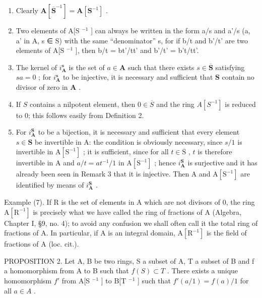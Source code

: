 \begin{enumerate}
\def\labelenumi{(\arabic{enumi})}
\item
  Clearly \(\mathbf{A}[\overline{\mathbf{S}}^{-1}] = \mathbf{A}[\mathbf{S}^{-1}]\) .
\item
  Two elements of A{[}S \(^{-1}\) {]} can always be written in the form a/s and a'/s (a, a' in A, s ∈ S) with the same ``denominator'' s, for if b/t and b'/t' are two elements of A{[}S \(^{-1}\) {]}, then b/t = bt'/tt' and b'/t' = b't/tt'.
\item
  The kernel of \(i_{\mathbf{A}}^{\mathbf{s}}\) is the set of \(a \in \mathbf{A}\) such that there exists \(s \in \overline{\mathbf{S}}\) satisfying \(sa = 0\) ; for \(i_{\mathbf{A}}^{\mathbf{s}}\) to be injective, it is necessary and sufficient that \(\mathbf{S}\) contain no divisor of zero in \(\mathbf{A}\) .
\item
  If \(S\) contains a nilpotent element, then \(0 \in \overline{S}\) and the ring \(A[S^{-1}]\) is reduced to 0; this follows easily from Definition 2.
\item
  For \(i_{\mathbf{A}}^{\mathbf{S}}\) to be a bijection, it is necessary and sufficient that every element \(s \in \mathbf{S}\) be invertible in A: the condition is obviously necessary, since \(s/1\) is invertible in \(\mathrm{A}[\mathrm{S}^{-1}]\) ; it is sufficient, since for all \(t \in \overline{\mathrm{S}}\) , \(t\) is therefore invertible in A and \(a/t = at^{-1}/1\) in \(\mathrm{A}[\mathrm{S}^{-1}]\) ; hence \(i_{\mathbf{A}}^{\mathbf{S}}\) is surjective and it has already been seen in Remark 3 that it is injective. Then A and \(\mathrm{A}[\mathrm{S}^{-1}]\) are identified by means of \(i_{\mathbf{A}}^{\mathbf{S}}\) .
\end{enumerate}

Example (7). If R is the set of elements in A which are not divisors of 0, the ring \(\mathrm{A}[\mathrm{R}^{-1}]\) is precisely what we have called the ring of fractions of A (Algebra, Chapter I, §9, no. 4); to avoid any confusion we shall often call it the total ring of fractions of A. In particular, if A is an integral domain, \(\mathrm{A}[\mathrm{R}^{-1}]\) is the field of fractions of A (loc. cit.).

PROPOSITION 2. Let A, B be two rings, S a subset of A, T a subset of B and f a homomorphism from A to B such that \(f(S) \subset T\) . There exists a unique homomorphism \(f'\) from A{[}S \(^{-1}\) {]} to B{[}T \(^{-1}\) {]} such that \(f'(a/1) = f(a)/1\) for all \(a \in A\) .

